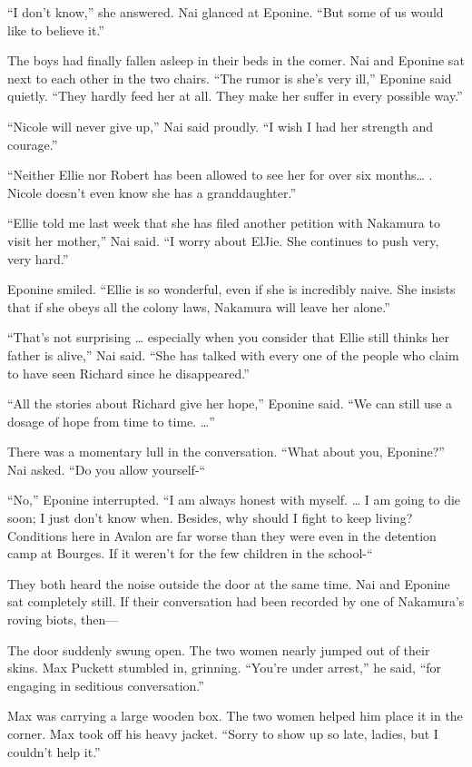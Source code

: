 \documentclass[]{article}
\begin{document}
{{“I don’t know,” she answered.  Nai glanced at Eponine.  “But some of us would like to believe it.”

The boys had finally fallen asleep in their beds in the comer.  Nai and Eponine sat next to each other in the two chairs.  “The rumor is she’s very ill,” Eponine said quietly.  “They hardly feed her at all.  They make her suffer in every possible way.”

“Nicole will never give up,” Nai said proudly.  “I wish I had her strength and courage.”

“Neither Ellie nor Robert has been allowed to see her for over six months… .  Nicole doesn’t even know she has a granddaughter.”

“Ellie told me last week that she has filed another petition with Nakamura to visit her mother,” Nai said.  “I worry about ElJie.  She continues to push very, very hard.”

Eponine smiled.  “Ellie is so wonderful, even if she is incredibly naive.  She insists that if she obeys all the colony laws, Nakamura will leave her alone.”

“That’s not surprising … especially when you consider that Ellie still thinks her father is alive,” Nai said.  “She has talked with every one of the people who claim to have seen Richard since he disappeared.”

“All the stories about Richard give her hope,” Eponine said.  “We can still use a dosage of hope from time to time.  …”

There was a momentary lull in the conversation.  “What about you, Eponine?” Nai asked.  “Do you allow yourself-“

“No,” Eponine interrupted.  “I am always honest with myself.  … I am going to die soon; I just don’t know when.  Besides, why should I fight to keep living? Conditions here in Avalon are far worse than they were even in the detention camp at Bourges.  If it weren’t for the few children in the school-“

They both heard the noise outside the door at the same time.  Nai and Eponine sat completely still.  If their conversation had been recorded by one of Nakamura’s roving biots, then—

The door suddenly swung open.  The two women nearly jumped out of their skins.  Max Puckett stumbled in, grinning.  “You’re under arrest,” he said, “for engaging in seditious conversation.”

Max was carrying a large wooden box.  The two women helped him place it in the corner.  Max took off his heavy jacket.  “Sorry to show up so late, ladies, but I couldn’t help it.”

}}
\end{document}
